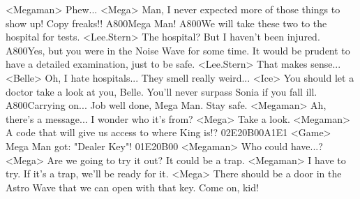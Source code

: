 <Megaman> Phew... 
<Mega> Man, I never expected more of those things to show up! Copy freaks!! 
{A8}{00}Mega Man! 
{A8}{00}We will take these two to the hospital for tests. 
<Lee.Stern> The hospital? But I haven't been injured. 
{A8}{00}Yes, but you were in the Noise Wave for some time. 
It would be prudent to have a detailed examination, just to be safe. 
<Lee.Stern> That makes sense... 
<Belle> Oh, I hate hospitals... 
They smell really weird... 
<Ice> You should let a doctor take a look at you, Belle. 
You'll never surpass Sonia if you fall ill. 
{A8}{00}Carrying on... Job well done, Mega Man. 
Stay safe. 
<Megaman> Ah, there's a message... I wonder who it's from? 
<Mega> Take a look. 
<Megaman> A code that will give us access to where King is!? 
{02}{E2}{0B}{00}{A1}{E1} 
<Game> Mega Man got: "Dealer Key"! 
{01}{E2}{0B}{00} 
<Megaman> Who could have...? 
<Mega> Are we going to try it out? 
It could be a trap. 
<Megaman> I have to try. 
If it's a trap, we'll be ready for it. 
<Mega> There should be a door in the Astro Wave that we can open with that key. 
Come on, kid! 
